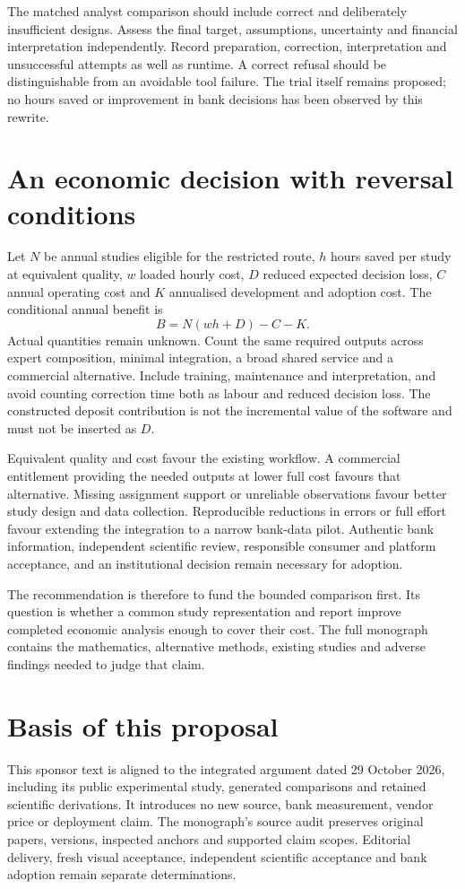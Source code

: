 The matched analyst comparison should include correct and deliberately
insufficient designs. Assess the final target, assumptions, uncertainty and
financial interpretation independently. Record preparation, correction,
interpretation and unsuccessful attempts as well as runtime. A correct
refusal should be distinguishable from an avoidable tool failure. The trial
itself remains proposed; no hours saved or improvement in bank decisions
has been observed by this rewrite.

\section*{An economic decision with reversal conditions}
Let $N$ be annual studies eligible for the restricted route, $h$ hours saved
per study at equivalent quality, $w$ loaded hourly cost, $D$ reduced expected
decision loss, $C$ annual operating cost and $K$ annualised development and
adoption cost. The conditional annual benefit is
\[ B=N(wh+D)-C-K. \]
Actual quantities remain unknown. Count the same required outputs across
expert composition, minimal integration, a broad shared service and a
commercial alternative. Include training, maintenance and interpretation,
and avoid counting correction time both as labour and reduced decision loss.
The constructed deposit contribution is not the incremental value of the
software and must not be inserted as $D$.

Equivalent quality and cost favour the existing workflow. A commercial
entitlement providing the needed outputs at lower full cost favours that
alternative. Missing assignment support or unreliable observations favour
better study design and data collection. Reproducible reductions in errors
or full effort favour extending the integration to a narrow bank-data
pilot. Authentic bank information, independent scientific review, responsible
consumer and platform acceptance, and an institutional decision remain
necessary for adoption.

The recommendation is therefore to fund the bounded comparison first. Its
question is whether a common study representation and report improve
completed economic analysis enough to cover their cost. The full monograph
contains the mathematics, alternative methods, existing studies and adverse
findings needed to judge that claim.

\section*{Basis of this proposal}
This sponsor text is aligned to the integrated argument dated
29 October 2026, including its public experimental study, generated
comparisons and retained scientific derivations. It introduces no new source, bank measurement,
vendor price or deployment claim. The monograph's source audit preserves
original papers, versions, inspected anchors and supported claim scopes.
Editorial delivery, fresh visual acceptance, independent scientific
acceptance and bank adoption remain separate determinations.
